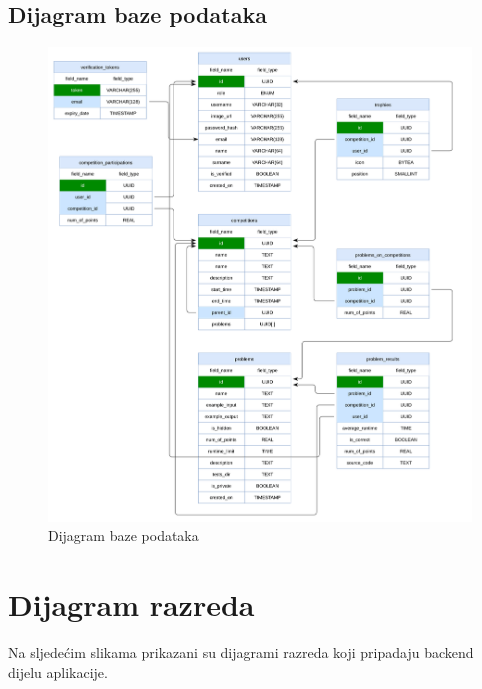		\subsection{Dijagram baze podataka}
		
		
		\begin{figure}[htbp]
			\centering
			\includegraphics[scale=0.4]{slike/db_dijagram.png}
			\caption{Dijagram baze podataka}
		\end{figure}
		\eject
		
			
		\section{Dijagram razreda}
		
			
			
			Na sljedećim slikama prikazani su dijagrami razreda koji pripadaju backend dijelu aplikacije.
			
